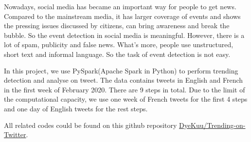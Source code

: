 Nowadays, social media has became an important way for people to get news. Compared to the mainstream media, it has larger coverage of events and shows the pressing issues discussed by citizens, can bring awareness and break the bubble. So the event detection in social media is meaningful. However, there is a lot of spam, publicity and false news. What's more, people use unstructured, short text and informal language. So the task of event detection is not easy.

In this project, we use PySpark(Apache Spark in Python) to perform trending detection and analyse on tweet. The data contains tweets in English and French in the first week of February 2020. There are 9 steps in total. Due to the limit of the computational capacity, we use one week of French tweets for the first 4 steps and one day of English tweets for the rest steps.

All related codes could be found on this github repository \href{https://github.com/DyeKuu/Trending-on-Twitter}{DyeKuu/Trending-on-Twitter}.